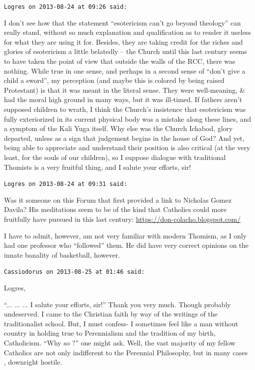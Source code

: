 \begin{footnotesize}
\begin{sffamily}
\hfill

\texttt{Logres on 2013-08-24 at 09:26 said:}

I don't see how that the statement ``esotericism can't go beyond theology'' can really stand, without so much explanation and qualification as to render it useless for what they are using it for. Besides, they are taking credit for the riches and glories of esotericism a little belatedly -- the Church until this last century seems to have taken the point of view that outside the walls of the RCC, there was nothing. While true in one sense, and perhaps in a second sense of ``don't give a child a sword'', my perception (and maybe this is colored by being raised Protestant) is that it was meant in the literal sense. They were well-meaning, \& had the moral high ground in many ways, but it was ill-timed. If fathers aren't supposed children to wrath, I think the Church's insistence that esotericism was fully exteriorized in its current physical body was a mistake along these lines, and a symptom of the Kali Yuga itself. Why else was the Church Ichabod, glory departed, unless as a sign that judgement begins in the house of God? And yet, being able to appreciate and understand their position is also critical (at the very least, for the souls of our children), so I suppose dialogue with traditional Thomists is a very fruitful thing, and I salute your efforts, sir!

\hfill

\texttt{Logres on 2013-08-24 at 09:31 said:}

Was it someone on this Forum that first provided a link to Nicholas Gomez Davila? His meditations seem to be of the kind that Catholics could more fruitfully have pursued in this last century: 
\url{https://don-colacho.blogspot.com/}

I have to admit, however, am not very familiar with modern Thomism, as I only had one professor who ``followed'' them. He did have very correct opinions on the innate banality of basketball, however.

\hfill

\texttt{Cassiodorus on 2013-08-25 at 01:46 said:}

Logres,

``... ... ... I salute your efforts, sir!'' Thank you very much. Though probably undeserved. I came to the Christian faith by way of the writings of the traditionalist school. But, I must confess- I sometimes feel like a man without country in holding true to Perennialism and the tradition of my birth, Catholicism. ``Why so ?'' one might ask. Well, the vast majority of my fellow Catholics are not only indifferent to the Perennial Philosophy, but in many cases , downright hostile.


\end{sffamily}
\end{footnotesize}
